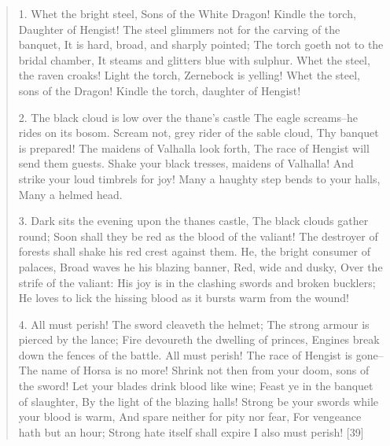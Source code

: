 \begin{quote}
1.
Whet the bright steel,
Sons of the White Dragon!
Kindle the torch,
Daughter of Hengist!
The steel glimmers not for the carving of the banquet,
It is hard, broad, and sharply pointed;
The torch goeth not to the bridal chamber,
It steams and glitters blue with sulphur.
Whet the steel, the raven croaks!
Light the torch, Zernebock is yelling!
Whet the steel, sons of the Dragon!
Kindle the torch, daughter of Hengist!

2.
The black cloud is low over the thane's castle
The eagle screams--he rides on its bosom.
Scream not, grey rider of the sable cloud,
Thy banquet is prepared!
The maidens of Valhalla look forth,
The race of Hengist will send them guests.
Shake your black tresses, maidens of Valhalla!
And strike your loud timbrels for joy!
Many a haughty step bends to your halls,
Many a helmed head.

3.
Dark sits the evening upon the thanes castle,
The black clouds gather round;
Soon shall they be red as the blood of the valiant!
The destroyer of forests shall shake his red crest against
them.
He, the bright consumer of palaces,
Broad waves he his blazing banner,
Red, wide and dusky,
Over the strife of the valiant:
His joy is in the clashing swords and broken bucklers;
He loves to lick the hissing blood as it bursts warm from the
wound!

4.
All must perish!
The sword cleaveth the helmet;
The strong armour is pierced by the lance;
Fire devoureth the dwelling of princes,
Engines break down the fences of the battle.
All must perish!
The race of Hengist is gone--
The name of Horsa is no more!
Shrink not then from your doom, sons of the sword!
Let your blades drink blood like wine;
Feast ye in the banquet of slaughter,
By the light of the blazing halls!
Strong be your swords while your blood is warm,
And spare neither for pity nor fear,
For vengeance hath but an hour;
Strong hate itself shall expire
I also must perish! [39]
\end{quote}

